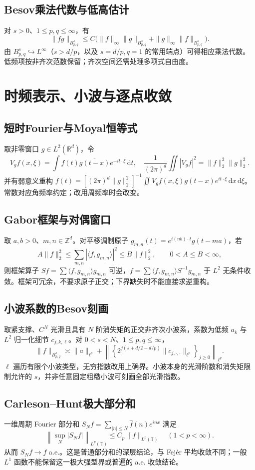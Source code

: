\documentclass[../main.tex]{subfiles}
\begin{document}
\subsection{Besov乘法代数与低高估计}
对 $s>0$、$1\le p,q\le\infty$，有
\[
\|fg\|_{B^s_{p,q}}\le C\bigl(\|f\|_\infty\|g\|_{B^s_{p,q}}+
\|g\|_\infty\|f\|_{B^s_{p,q}}\bigr).
\]
由 $B^s_{p,q}\hookrightarrow L^\infty$（$s>d/p$，以及 $s=d/p,q=1$ 的常用端点）可得相应乘法代数。低频项按非齐次范数保留；齐次空间还需处理多项式自由度。
\section{时频表示、小波与逐点收敛}
\subsection{短时Fourier与Moyal恒等式}
取非零窗口 $g\in L^2(\mathbb R^d)$，令
\[
V_gf(x,\xi)=\int f(t)\overline{g(t-x)}e^{-it\cdot\xi}\,\mathrm dt,
\quad
\frac1{(2\pi)^d}\iint|V_gf|^2=\|f\|_2^2\|g\|_2^2.
\]
并有弱意义重构 $f(t)=[(2\pi)^d\|g\|_2^2]^{-1}\iint V_gf(x,\xi)g(t-x)e^{it\cdot\xi}\,\mathrm dx\,\mathrm d\xi$。常数对应角频率约定；改用周频率时会改变。
\subsection{Gabor框架与对偶窗口}
取 $a,b>0$、$m,n\in\mathbb Z^d$。对平移调制原子 $g_{m,n}(t)=e^{i(nb)\cdot t}g(t-ma)$，若
\[
A\|f\|_2^2\le\sum_{m,n}|\langle f,g_{m,n}\rangle|^2\le B\|f\|_2^2,
\qquad0<A\le B<\infty,
\]
则框架算子 $Sf=\sum\langle f,g_{m,n}\rangle g_{m,n}$ 可逆，$f=\sum\langle f,g_{m,n}\rangle S^{-1}g_{m,n}$ 于 $L^2$ 无条件收敛。框架可冗余，不要求原子正交；下界缺失时不能直接求逆重构。
\subsection{小波系数的Besov刻画}
取紧支撑、$C^N$ 光滑且具有 $N$ 阶消失矩的正交非齐次小波系，系数为低频 $a_k$ 与 $L^2$ 归一化细节 $c_{j,k,\ell}$。对 $0<s<N$、$1\le p,q\le\infty$，
\[
\|f\|_{B^s_{p,q}}\asymp\|a\|_{\ell^p}
+\left\|\left\{2^{j(s+d/2-d/p)}\|c_{j,\cdot,\cdot}\|_{\ell^p}\right\}_{j\ge0}\right\|_{\ell^q}.
\]
$\ell$ 遍历有限个小波类型，无穷指数改用上确界。小波本身的光滑阶数和消失矩限制允许的 $s$，并非任意固定粗糙小波可刻画全部光滑指数。
\subsection{Carleson--Hunt极大部分和}
一维周期 Fourier 部分和 $S_Nf=\sum_{|n|\le N}\widehat f(n)e^{inx}$ 满足
\[
\left\|\sup_N|S_Nf|\right\|_{L^p(\mathbb T)}\le C_p\|f\|_{L^p(\mathbb T)}
\quad(1<p<\infty).
\]
从而 $S_Nf\to f$ a.e.。这是普通部分和的深层结论，与 Fejér 平均收敛不同；一般 $L^1$ 函数不能保留这一极大强型界或普遍的 a.e. 收敛结论。
\end{document}
